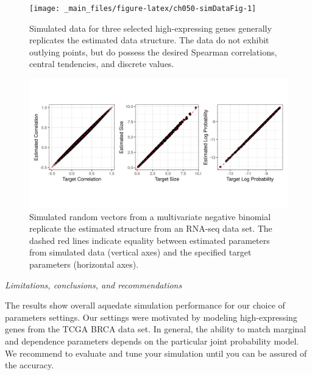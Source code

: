\documentclass[
]{jss}
\begin{document}
\begin{CodeChunk}
\begin{figure}

{\centering \texttt{[image: \_main\_files/figure-latex/ch050-simDataFig-1]} 

}

\caption[Simulated data for three selected high-expressing genes generally replicates the estimated data structure]{Simulated data for three selected high-expressing genes generally replicates the estimated data structure. The data do not exhibit outlying points, but do possess the desired Spearman correlations, central tendencies, and discrete values.}\label{fig:ch050-simDataFig}
\end{figure}
\end{CodeChunk}

\begin{CodeChunk}
\begin{figure}

{\centering \includegraphics[width=0.8\linewidth]{fig/ch050-figBRCA} 

}

\caption[Simulated random vectors from a multivariate negative binomial replicate the estimated structure from an RNA-seq data set]{Simulated random vectors from a multivariate negative binomial replicate the estimated structure from an RNA-seq data set. The dashed red lines indicate equality between estimated parameters from simulated data (vertical axes) and the specified target parameters (horizontal axes).}\label{fig:ch050-figBRCA}
\end{figure}
\end{CodeChunk}

\emph{Limitations, conclusions, and recommendations}

The results show overall aquedate simulation performance for our choice of parameters settings. Our settings were motivated by modeling high-expressing genes from the TCGA BRCA data set. In general, the ability to match marginal and dependence parameters depends on the particular joint probability model. We recommend to evaluate and tune your simulation until you can be assured of the accuracy.
\end{document}
